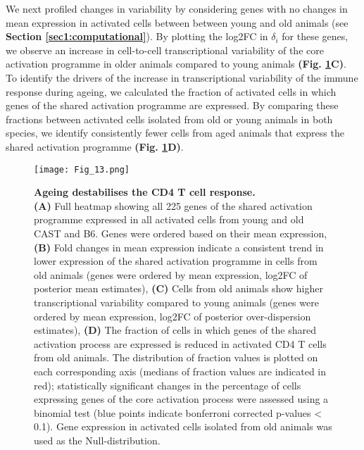 We next profiled changes in variability by considering genes with no changes in mean expression in activated cells between between young and old animals (see \textbf{Section \ref{sec1:computational}}). 
By plotting the log2FC in $\delta_i$ for these genes, we observe an increase in cell-to-cell transcriptional variability of the core activation programme in older animals compared to young animals \textbf{(Fig. \ref{fig1:variability_ageing}C)}. 
To identify the drivers of the increase in transcriptional variability of the immune response during ageing, we calculated the fraction of activated cells in which genes of the shared activation programme are expressed. 
By comparing these fractions between activated cells isolated from old or young animals in both species, we identify consistently fewer cells from aged animals that express the shared activation programme \textbf{(Fig. \ref{fig1:variability_ageing}D)}. \\

\newpage

\begin{figure}[!ht]
\centering
\texttt{[image: Fig\_13.png]}
\caption[Ageing destabilises the CD4\plus{} T cell response]{\textbf{Ageing destabilises the CD4\plus{} T cell response.} \\
\textbf{(A)} Full heatmap showing all 225 genes of the shared activation programme expressed in all activated cells from young and old CAST and B6. Genes were ordered based on their mean expression, 
\textbf{(B)} Fold changes in mean expression indicate a consistent trend in lower expression of the shared activation programme in cells from old animals (genes were ordered by mean expression, log2FC of posterior mean estimates), 
\textbf{(C)} Cells from old animals show higher transcriptional variability compared to young animals (genes were ordered by mean expression, log2FC of posterior over-dispersion estimates), 
\textbf{(D)} The fraction of cells in which genes of the shared activation process are expressed is reduced in activated CD4\plus{} T cells from old animals. 
The distribution of fraction values is plotted on each corresponding axis (medians of fraction values are indicated in red); statistically significant changes in the percentage of cells expressing genes of the core activation process were assessed using a binomial test (blue points indicate bonferroni corrected p-values < 0.1). Gene expression in activated cells isolated from old animals was used as the Null-distribution.}
\label{fig1:variability_ageing}
\end{figure}

